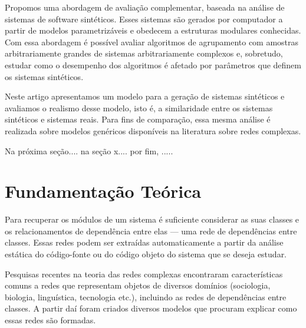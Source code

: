 \documentclass{acm_proc_article-sp}
\begin{document}


Propomos uma abordagem de avaliação complementar, baseada na análise de sistemas de software sintéticos. Esses sistemas são gerados por computador a partir de modelos parametrizáveis e obedecem a estruturas modulares conhecidas. Com essa abordagem é possível avaliar algoritmos de agrupamento com amostras arbitrariamente grandes de sistemas arbitrariamente complexos e, sobretudo, estudar como o desempenho dos algoritmos é afetado por parâmetros que definem os sistemas sintéticos.

Neste artigo apresentamos um modelo para a geração de sistemas sintéticos e avaliamos o realismo desse modelo, isto é, a similaridade entre os sistemas sintéticos e sistemas reais. Para fins de comparação, essa mesma análise é realizada sobre modelos genéricos disponíveis na literatura sobre redes complexas.

Na próxima seção.... na seção x.... por fim, .....

\section{Fundamentação Teórica}

Para recuperar os módulos de um sistema é suficiente considerar as suas classes e os relacionamentos de dependência entre elas --- uma rede de dependências entre classes. Essas redes podem ser extraídas automaticamente a partir da análise estática do código-fonte ou do código objeto do sistema que se deseja estudar.

Pesquisas recentes na teoria das redes complexas encontraram características comuns a redes que representam objetos de diversos domínios (sociologia, biologia, linguística, tecnologia etc.), incluindo as redes de dependências entre classes. A partir daí foram criados diversos modelos que procuram explicar como essas redes são formadas.

\end{document}
